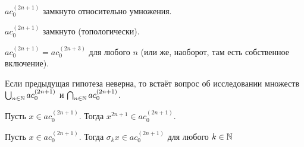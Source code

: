 \begin{hypothesis}
	$ac_0^{(2n+1)}$ замкнуто относительно умножения.
\end{hypothesis}

\begin{hypothesis}
	$ac_0^{(2n+1)}$ замкнуто (топологически).
\end{hypothesis}

\begin{hypothesis}
	$ac_0^{(2n+1)} = ac_0^{(2n+3)}$ для любого $n$ (или же, наоборот, там есть собственное включение).
\end{hypothesis}

\begin{hypothesis}
	Если предыдущая гипотеза неверна, то встаёт вопрос об исследовании множеств
	$\bigcup_{n\in\mathbb{N}}ac_0^{(2n+1)}$ и 	$\bigcap_{n\in\mathbb{N}}ac_0^{(2n+1)}$.
\end{hypothesis}

\begin{hypothesis}
	Пусть $x\in ac_0^{(2n+1)}$.
	Тогда $x^{2n+1} \in ac_0^{(2n+1)}$.
\end{hypothesis}

\begin{hypothesis}
	Пусть $x\in ac_0^{(2n+1)}$.
	Тогда $\sigma_k x \in ac_0^{(2n+1)}$ для любого $k\in \mathbb{N}$
\end{hypothesis}
